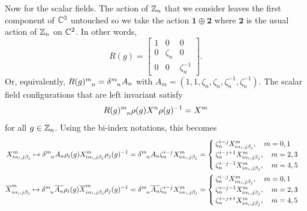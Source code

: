         Now for the scalar fields. The action of $\mathbb{Z}_n$ that we consider leaves the first component of $\mathbb{C}^3$ untouched so we take the action $\boldsymbol{1}\oplus\boldsymbol{2}$ where $\boldsymbol{2}$ is the usual action of $\mathbb{Z}_n$ on $\mathbb{C}^2$. In other words, 
        \begin{equation}
            R(g)=
            \begin{bmatrix}
                1 & 0 & 0 \\
                0 & \zeta_n & 0 \\
                0 & 0 & \zeta^{-1}_n
            \end{bmatrix}.
        \end{equation}
        Or, equivalently, $R(g)\indices{^m_n}=\delta\indices{^m_n}A_n$ with $A_m=(1,1,\zeta_n,\zeta_n,\zeta^{-1}_n,\zeta^{-1}_n)$. The scalar field configurations that are left invariant satisfy
        \begin{equation}
            R(g)\indices{^m_n}\rho(g)X^n\rho(g)^{-1}=X^m
        \end{equation}
        for all $g\in\mathbb{Z}_n$. Using the bi-index notations, this becomes
        \begin{align}
            X^m_{i\alpha_i,j\beta_j}\mapsto  \delta\indices{^m_n}A_n\rho_i(g)X^m_{i\alpha_i,j\beta_j}\rho_j(g)^{-1}  = \delta\indices{^m_n}A_n\zeta^{i-j}_n X^m_{i\alpha_i,j\beta_j} =
            \begin{cases}
                \zeta^{i-j}_nX^m_{i\alpha_i,j\beta_j},\quad m=0,1\\
                \zeta^{i-j+1}_nX^m_{i\alpha_i,j\beta_j},\quad m=2,3\\
                \zeta^{i-j-1}_nX^m_{i\alpha_i,j\beta_j},\quad m=4,5\\
            \end{cases}\\
            \bar{X}^m_{i\alpha_i,j\beta_j}\mapsto \delta\indices{^m_n}\bar{A_n}\rho_i(g)\bar{X}^m_{i\alpha_i,j\beta_j}\rho_j(g)^{-1}  = \delta\indices{^m_n}\bar{A_n}\zeta^{i-j}_n X^m_{i\alpha_i,j\beta_j} =
            \begin{cases}
                \zeta^{i-j}_nX^m_{i\alpha_i,j\beta_j},\quad m=0,1\\
                \zeta^{i-j-1}_nX^m_{i\alpha_i,j\beta_j},\quad m=2,3\\
                \zeta^{i-j+1}_nX^m_{i\alpha_i,j\beta_j},\quad m=4,5\\
            \end{cases}
        \end{align}
